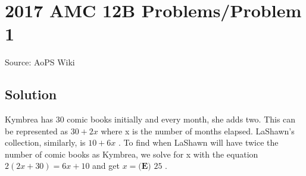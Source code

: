 \documentclass[12pt]{article}
\begin{document}
\section*{{2017 AMC 12B Problems/Problem 1}}
Source: AoPS Wiki

\subsection*{Solution}
Kymbrea has $30$ comic books initially and every month, she adds two. This can be represented as $30 + 2x$ where x is the number of months elapsed. LaShawn's collection, similarly, is $10 + 6x$ . To find when LaShawn will have twice the number of comic books as Kymbrea, we solve for x with the equation $2(2x + 30) = 6x + 10$ and get $x = \boxed{\textbf{(E) } 25}$ .
\end{document}
